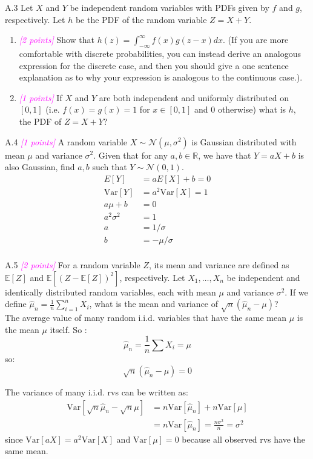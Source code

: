 \documentclass{article}
\newcommand{\field}[1]{\mathbb{#1}}
\newcommand{\1}{\mathbf{1}}
\newcommand{\E}{\mathbb{E}}
\newcommand{\R}{\field{R}} %
\newcommand{\points}[1]{\small\textcolor{magenta}{\emph{[#1 points]}} \normalsize}
\begin{document}
A.3 Let $X$ and $Y$ be independent random variables with PDFs given by $f$ and $g$, respectively. Let $h$ be the PDF of the random variable $Z = X+Y$.
\begin{enumerate}
	\item \points{2} Show that $h(z) = \int_{-\infty}^\infty f(x) g( z - x ) d x $.  (If you are more comfortable with discrete probabilities, you can instead derive an analogous expression for the discrete case,  and then you should give a one sentence explanation as to why your expression is analogous to the continuous case.).
	\item \points{1} If $X$ and $Y$ are both independent and uniformly distributed on $[0,1]$ (i.e. $f(x)=g(x)=1$ for $x \in [0,1]$ and $0$ otherwise) what is $h$, the PDF of $Z=X+Y$?
\end{enumerate}

A.4 \points{1} A random variable $X \sim \mathcal{N}(\mu, \sigma^2)$ is Gaussian distributed with mean $\mu$ and variance $\sigma^2$. Given that for any $a,b \in \R$, we have that $Y = aX + b$ is also Gaussian, find $a,b$ such that $Y \sim \mathcal{N}(0,1)$.
\begin{align*}
    E[Y] &= aE[X]+b = 0\\
    \text{Var}[Y] &= a^2\text{Var}[X] = 1\\
    a\mu + b &= 0\\
    a^2\sigma^2 &= 1\\
    a &= 1/\sigma\\
    b &= - \mu/\sigma\\
\end{align*}

A.5 \points{2} For a random variable $Z$, its mean and variance are defined as $\E[Z]$ and $\E[(Z-\E[Z])^2]$, respectively. Let $X_1,\dots,X_n$ be independent and identically distributed random variables, each with mean $\mu$ and variance $\sigma^2$. If we define $\widehat{\mu}_n = \frac{1}{n} \sum_{i=1}^n X_i$, what is the mean and variance of $\sqrt{n}(\widehat{\mu}_n - \mu)$? \\

The average value of many random i.i.d. variables that have the same mean $\mu$ is the mean $\mu$ itself. So :
$$\hat\mu_n = \frac{1}{n}\sum X_i = \mu$$
so:
$$\sqrt{n}(\hat\mu_n - \mu) = 0$$

The variance of many i.i.d. rvs can be written as:
\begin{align*}
    \text{Var}[\sqrt n \hat\mu_n - \sqrt n \mu] &= n\text{Var}[\hat\mu_n]+n\text{Var}[\mu] \\
    &= n \text{Var}[\hat\mu_n] = \frac{n\sigma^2}{n} = \sigma^2
\end{align*}
since $\text{Var}[aX]=a^2\text{Var}[X]$ and $\text{Var}[\mu]=0$ because all observed rvs have the same mean.\\
\end{document}
